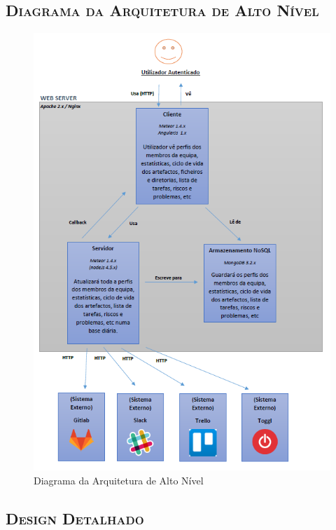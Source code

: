 \documentclass[12pt]{article}
\begin{document}
\vspace{5mm}


\pagebreak
\subsection{ \textsc{Diagrama da Arquitetura de Alto Nível}}


\vspace{5mm}

\begin{figure}[h!]
	\centering \includegraphics[width=12cm]{public/Architecture and Design of Software_2.png}
	\caption{Diagrama da Arquitetura de Alto Nível}
\end{figure}

\subsection{ \textsc{Design Detalhado}}
\end{document}
